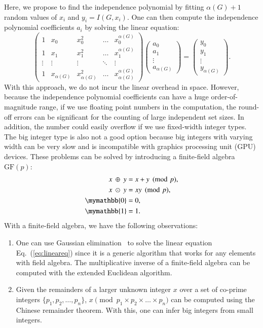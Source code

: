 \documentclass[onefignum, onetabnum]{siamart190516}
\newcommand{\<}{\langle}
\renewcommand{\>}{\rangle}
\newcommand{\Eq}[1]{Eq.~(\ref{#1})}
\begin{document}
Here, we propose to find the independence polynomial by fitting $\alpha(G)+1$ random values of $x_{i}$ and $y_{i} = I(G,x_{i})$. One can then compute the independence polynomial coefficients $a_{i}$ by solving the linear equation: 
\begin{equation}
\left(\begin{matrix}
1 & x_0 & x_0^2 & \ldots & x_0^{\alpha(G)} \\
1 & x_1 & x_1^2 & \ldots & x_1^{\alpha(G)} \\
\vdots & \vdots & \vdots &\ddots & \vdots \\
1 & x_{\alpha(G)} & x_{\alpha(G)}^2 & \ldots & x_{\alpha(G)}^{\alpha(G)}
\end{matrix}\right)
\left(\begin{matrix}
a_0 \\ a_1 \\ \vdots \\ a_{\alpha(G)}
\end{matrix}\right)
= \left(\begin{matrix}
y_0 \\ y_1 \\ \vdots \\ y_{\alpha(G)}
\end{matrix}\right).\label{eq:lineareq}
\end{equation}
With this approach, we do not incur the linear overhead in space. However, because the independence polynomial coefficients can have a huge order-of-magnitude range, if we use floating point numbers in the computation, the round-off errors can be significant for the counting of large independent set sizes. In addition, the number could easily overflow if we use fixed-width integer types. The big integer type is also not a good option because big integers with varying width can be very slow and is incompatible with graphics processing unit (GPU) devices. These problems can be solved by introducing a finite-field algebra $\text{GF}(p)$:
\begin{equation}
\begin{split}
    x ~\oplus~ y &= x+y\pmod p,\\
    x ~\odot~ y &= xy\pmod p,\\
    \mymathbb{0} &= 0,\\
    \mymathbb{1} &= 1.
\end{split}\label{eq:finitefield}
\end{equation}
With a finite-field algebra, we have the following observations:
\begin{enumerate}
    \item One can use Gaussian elimination~\cite{Golub2013} to solve the linear equation \Eq{eq:lineareq} since it is a generic algorithm that works for any elements with field algebra. The multiplicative inverse of a finite-field algebra can be computed with the extended Euclidean algorithm.
    \item Given the remainders of a larger unknown integer $x$ over a set of co-prime integers $\{p_1, p_2, \ldots, p_n\}$,
    $x \pmod {p_1 \times p_2 \times \ldots \times p_n}$ can be computed using the Chinese remainder theorem. With this, one can infer big integers from small integers.
\end{enumerate}
\end{document}
